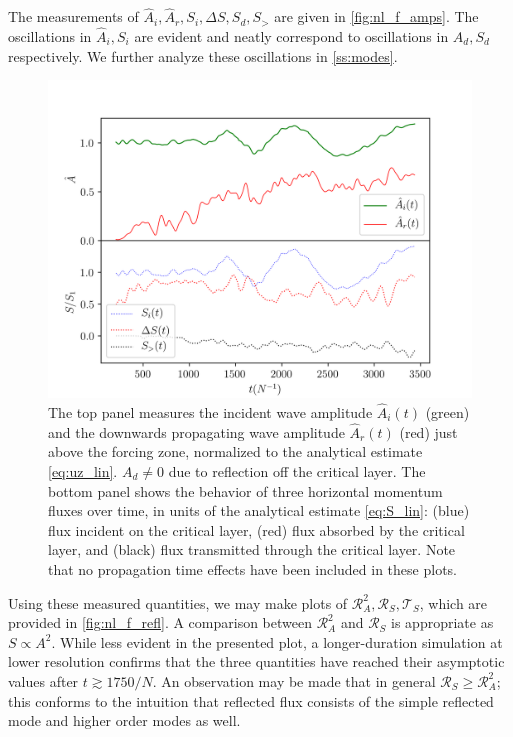\documentclass[
        fleqn,
        usenatbib,
    ]{mnras}
\begin{document}
The measurements of $\hat{A}_i, \hat{A}_r, S_i, \Delta S, S_d, S_>$ are given in
\autoref{fig:nl_f_amps}. The oscillations in $\hat{A}_i, S_i$ are evident and
neatly correspond to oscillations in $A_d, S_d$ respectively. We further analyze
these oscillations in \autoref{ss:modes}.

\begin{figure}[t]
    \centering
    \includegraphics[width=\columnwidth]{plots/nl_f_amps.png}
    \caption{The top panel measures the incident wave amplitude $\hat{A}_i(t)$
    (green) and the downwards propagating wave amplitude $\hat{A}_r(t)$ (red)
    just above the forcing zone, normalized to the analytical estimate
    \autoref{eq:uz_lin}. $A_d \neq 0$ due to reflection off the critical layer.
    The bottom panel shows the behavior of three horizontal momentum fluxes over
    time, in units of the analytical estimate \autoref{eq:S_lin}: (blue) flux
    incident on the critical layer, (red) flux absorbed by the critical layer,
    and (black) flux transmitted through the critical layer. Note that no
    propagation time effects have been included in these plots.
    }\label{fig:nl_f_amps}
\end{figure}

Using these measured quantities, we may make plots of $\mathcal{R}_A^2,
\mathcal{R}_S, \mathcal{T}_S$, which are provided in \autoref{fig:nl_f_refl}. A
comparison between $\mathcal{R}_A^2$ and $\mathcal{R}_S$ is appropriate as $S
\propto A^2$. While less evident in the presented plot, a longer-duration
simulation at lower resolution confirms that the three quantities have reached
their asymptotic values after $t \gtrsim 1750/N$. An observation may be made
that in general $\mathcal{R}_S \geq \mathcal{R}_A^2$; this conforms to the
intuition that reflected flux consists of the simple reflected mode and higher
order modes as well.
\end{document}
